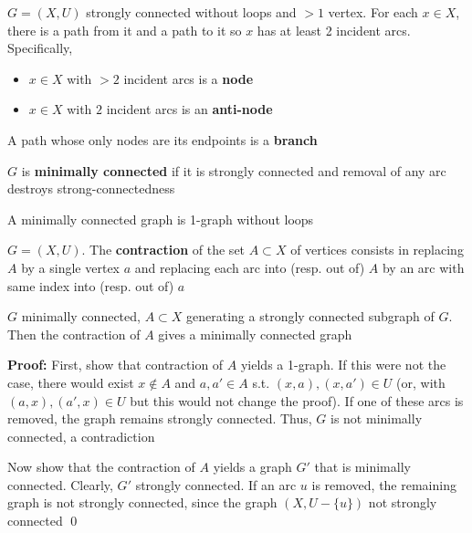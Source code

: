 \documentclass[aspectratio=43]{beamer}
\begin{document}
\begin{frame}
\begin{definition}
$G=(X,U)$ strongly connected without loops and $>1$ vertex. For each $x\in X$, there is a path from it and a path to it so $x$ has at least 2 incident arcs. Specifically,
\begin{itemize}
\item $x\in X$ with $>2$ incident arcs is a \textbf{node}
\item $x\in X$ with $2$ incident arcs is an \textbf{anti-node}
\end{itemize}
A path whose only nodes are its endpoints is a \textbf{branch}
\end{definition}
\vfill
\begin{definition}
$G$ is \textbf{minimally connected} if it is strongly connected and removal of any arc destroys strong-connectedness
\end{definition}
A minimally connected graph is 1-graph without loops
\vfill
\begin{definition}[Contraction]
$G=(X,U)$. The \textbf{contraction} of the set $A\subset X$ of vertices consists in replacing $A$ by a single vertex $a$ and replacing each arc into (resp. out of) $A$ by an arc with same index into (resp. out of) $a$
\end{definition}
\end{frame}


\begin{frame}
\begin{theorem}
$G$ minimally connected, $A\subset X$ generating a strongly connected subgraph of $G$. Then the contraction of $A$ gives a minimally connected graph
\end{theorem}
\vfill
\textbf{Proof:}
First, show that contraction of $A$ yields a 1-graph. 
If this were not the case, there would exist $x\not\in A$ and $a,a'\in A$ s.t. $(x,a),(x,a')\in U$ (or, with $(a,x),(a',x)\in U$ but this would not
change the proof). 
If one of these arcs is removed, the graph remains strongly
connected. Thus, $G$ is not minimally connected, a contradiction

\vskip1cm
Now show that the contraction of $A$ yields a graph $G'$ that is minimally connected. Clearly, $G'$ strongly connected. If an arc $u$ is removed, the remaining graph is not strongly connected, since the graph
$(X,U-\{u\})$ not strongly connected \qed
\end{frame}
\end{document}
